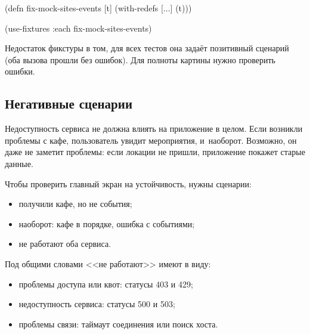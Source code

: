 \else

\begin{english}
  \begin{clojure}
(defn fix-mock-sites-events [t]
  (with-redefs [...]
    (t)))

(use-fixtures :each fix-mock-sites-events)
  \end{clojure}
\end{english}

\fi

Недостаток фикстуры в том, для всех тестов она задаёт позитивный сценарий (оба
вызова прошли без ошибок). Для полноты картины нужно проверить ошибки.

\subsection{Негативные сценарии}


Недоступность сервиса не должна влиять на приложение в целом. Если возникли
проблемы с кафе, пользователь увидит мероприятия, и~наоборот. Возможно, он даже
не заметит проблемы: если локации не пришли, приложение покажет старые данные.

Чтобы проверить главный экран на устойчивость, нужны сценарии:

\begin{itemize}

\item
  получили кафе, но не события;

\item
  наоборот: кафе в порядке, ошибка с событиями;

\item
  не работают оба сервиса.

\end{itemize}

Под общими словами <<не работают>> имеют в виду:


\begin{itemize}

\item
  проблемы доступа или квот: статусы 403 и 429;

\item
  недоступность сервиса: статусы 500 и 503;

\item
  проблемы связи: таймаут соединения или поиск хоста.

\end{itemize}

